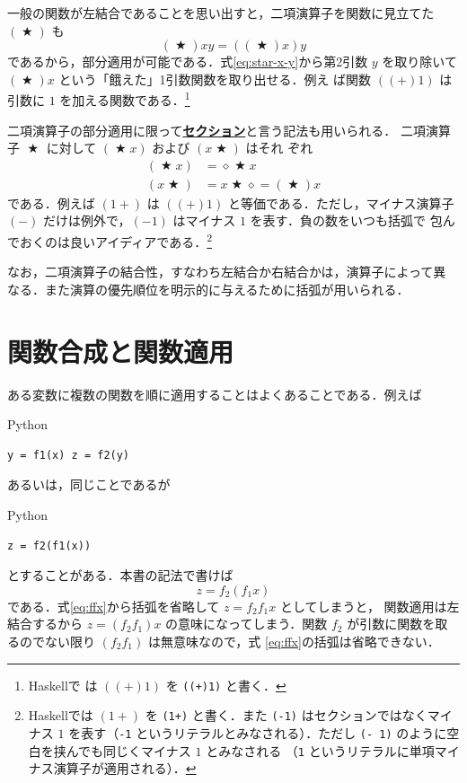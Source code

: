 \documentclass[a5paper,twoside,fleqn]{jsbook}
\newcommand{\programminglanguage}[1]{\textsf{#1}}
\newcommand{\haskell}{\programminglanguage{Haskell}}
\newcommand{\python}{\programminglanguage{Python}}
\newcommand{\keyword}[1]{{\underline{\textbf{#1}}}}
\newcommand{\code}[1]{\texttt{#1}}
\newenvironment{pythoncode}{\begin{itembox}[r]{\python}}{\end{itembox}}
\newcommand{\mAnonParam}{\diamond}
\DeclareMathOperator{\mBinOp}{\bigstar}
\begin{document}
一般の関数が左結合であることを思い出すと，二項演算子を関数に見立てた
$(\mBinOp)$ も
\begin{equation}
\label{eq:star-x-y}
(\mBinOp)xy=((\mBinOp)x)y
\end{equation}
であるから，部分適用が可能である．式\eqref{eq:star-x-y}から第2引数 $y$
を取り除いて $(\mBinOp)x$ という「餓えた」1引数関数を取り出せる．例え
ば関数 $((+)1)$ は引数に $1$ を加える関数である．\footnote{\haskell で
  は $((+)1)$ を \code{((+)1)} と書く．}

二項演算子の部分適用に限って\keyword{セクション}と言う記法も用いられる．
二項演算子 $\mBinOp$ に対して $(\mBinOp x)$ および $(x\mBinOp)$ はそれ
ぞれ
\begin{align}
(\mBinOp x)&=\mAnonParam\mBinOp
  x\\ (x\mBinOp)&=x\mBinOp\mAnonParam=(\mBinOp)x
\end{align}
である．例えば $(1+)$ は $((+)1)$ と等価である．ただし，マイナス演算子
$(-)$ だけは例外で，$(-1)$ はマイナス $1$ を表す．負の数をいつも括弧で
包んでおくのは良いアイディアである．\footnote{\haskell では $(1+)$ を
  \code{(1+)} と書く．また \code{(-1)} はセクションではなくマイナス
  $1$ を表す（\code{-1} というリテラルとみなされる）．ただし \code{(-
    1)} のように空白を挟んでも同じくマイナス $1$ とみなされる
       （\code{1} というリテラルに単項マイナス演算子が適用される）．}

なお，二項演算子の結合性，すなわち左結合か右結合かは，演算子によって異
なる．また演算の優先順位を明示的に与えるために括弧が用いられる．

\section{関数合成と関数適用}

ある変数に複数の関数を順に適用することはよくあることである．例えば
\begin{pythoncode}
\begin{verbatim}
y = f1(x) z = f2(y)
\end{verbatim}
\end{pythoncode}
あるいは，同じことであるが
\begin{pythoncode}
\begin{verbatim}
z = f2(f1(x))
\end{verbatim}
\end{pythoncode}
とすることがある．本書の記法で書けば
\begin{equation}
\label{eq:ffx}
z=f_2(f_1x)
\end{equation}
である．式\eqref{eq:ffx}から括弧を省略して $z=f_2f_1x$ としてしまうと，
関数適用は左結合するから $z=(f_2f_1)x$ の意味になってしまう．関数
$f_2$ が引数に関数を取るのでない限り $(f_2f_1)$ は無意味なので，式
\eqref{eq:ffx}の括弧は省略できない．
\end{document}

